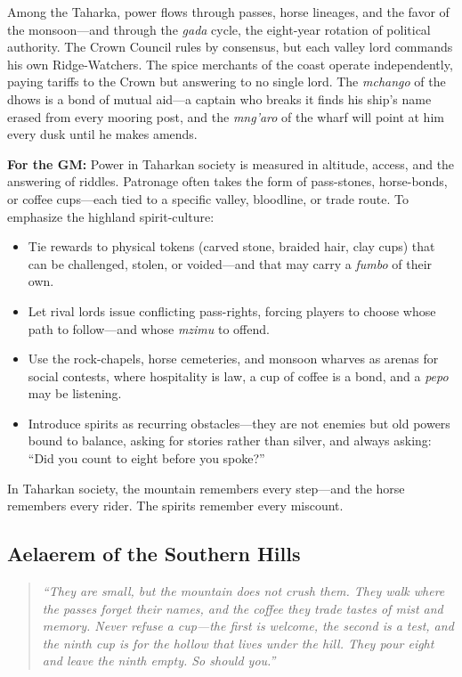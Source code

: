 \begin{tcolorbox}[colback=black!3,colframe=black!40!white,title={Patronage \& Power},breakable]
Among the Taharka, power flows through passes, horse lineages, and the favor of the monsoon---and through the \textit{gada} cycle, the eight-year rotation of political authority. The Crown Council rules by consensus, but each valley lord commands his own Ridge-Watchers. The spice merchants of the coast operate independently, paying tariffs to the Crown but answering to no single lord. The \textit{mchango} of the dhows is a bond of mutual aid---a captain who breaks it finds his ship's name erased from every mooring post, and the \textit{mng'aro} of the wharf will point at him every dusk until he makes amends.

\textbf{For the GM:}
Power in Taharkan society is measured in altitude, access, and the answering of riddles. Patronage often takes the form of pass-stones, horse-bonds, or coffee cups---each tied to a specific valley, bloodline, or trade route. To emphasize the highland spirit-culture:
\begin{itemize}
\item Tie rewards to physical tokens (carved stone, braided hair, clay cups) that can be challenged, stolen, or voided---and that may carry a \textit{fumbo} of their own.
\item Let rival lords issue conflicting pass-rights, forcing players to choose whose path to follow---and whose \textit{mzimu} to offend.
\item Use the rock-chapels, horse cemeteries, and monsoon wharves as arenas for social contests, where hospitality is law, a cup of coffee is a bond, and a \textit{pepo} may be listening.
\item Introduce spirits as recurring obstacles---they are not enemies but old powers bound to balance, asking for stories rather than silver, and always asking: ``Did you count to eight before you spoke?''
\end{itemize}
In Taharkan society, the mountain remembers every step---and the horse remembers every rider. The spirits remember every miscount.
\end{tcolorbox}

\clearpage
\subsection{Aelaerem of the Southern Hills}
\label{subsec:taharka-aelaerem}

\begin{quote}
  \textit{``They are small, but the mountain does not crush them. They walk where the passes forget their names, and the coffee they trade tastes of mist and memory. Never refuse a cup---the first is welcome, the second is a test, and the ninth cup is for the hollow that lives under the hill. They pour eight and leave the ninth empty. So should you.''}
\end{quote}

